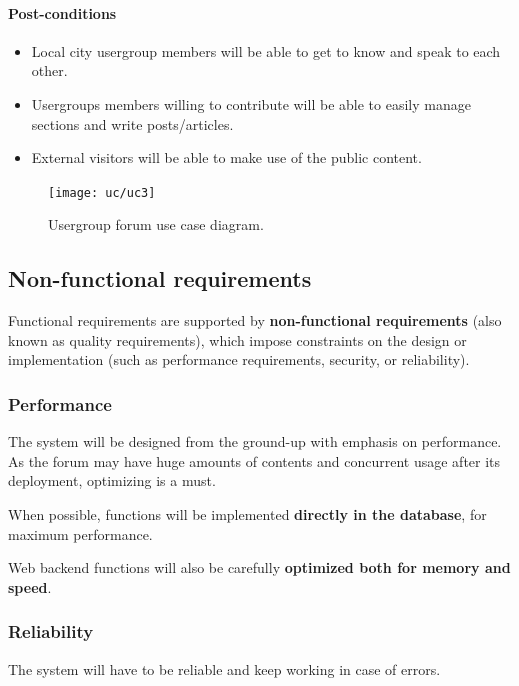 \documentclass[12pt]{report}
\renewcommand\emph{\textbf}
\begin{document}
                    \paragraph{Post-conditions}
                        \begin{itemize}
                            \item Local city usergroup members will be able to get to know and speak to each other.
                            \item Usergroups members willing to contribute will be able to easily manage sections and write posts/articles.
                            \item External visitors will be able to make use of the public content.
                        \end{itemize}

                    \begin{figure}[!htb]
                    \caption{Usergroup forum use case diagram.}
                    \centering
                    \texttt{[image: uc/uc3]}
                    \end{figure}

            \subsection{Non-functional requirements}
                Functional requirements are supported by \emph{non-functional requirements} (also known as quality requirements), which impose constraints on the design or implementation (such as performance requirements, security, or reliability).

                \subsubsection{Performance}
                    The system will be designed from the ground-up with emphasis on performance. As the forum may have huge amounts of contents and concurrent usage after its deployment, optimizing is a must.

                    When possible, functions will be implemented \emph{directly in the database}, for maximum performance.

                    Web backend functions will also be carefully \emph{optimized both for memory and speed}.

                \subsubsection{Reliability}
                    The system will have to be reliable and keep working in case of errors.
\end{document}
